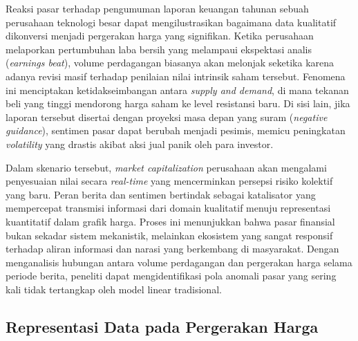 \begin{example}
    Reaksi pasar terhadap pengumuman laporan keuangan tahunan sebuah perusahaan teknologi besar dapat mengilustrasikan bagaimana data kualitatif dikonversi menjadi pergerakan harga yang signifikan. Ketika perusahaan melaporkan pertumbuhan laba bersih yang melampaui ekspektasi analis (\textit{earnings beat}), volume perdagangan biasanya akan melonjak seketika karena adanya revisi masif terhadap penilaian nilai intrinsik saham tersebut. Fenomena ini menciptakan ketidakseimbangan antara \textit{supply and demand}, di mana tekanan beli yang tinggi mendorong harga saham ke level resistansi baru. Di sisi lain, jika laporan tersebut disertai dengan proyeksi masa depan yang suram (\textit{negative guidance}), sentimen pasar dapat berubah menjadi pesimis, memicu peningkatan \textit{volatility} yang drastis akibat aksi jual panik oleh para investor.

    Dalam skenario tersebut, \textit{market capitalization} perusahaan akan mengalami penyesuaian nilai secara \textit{real-time} yang mencerminkan persepsi risiko kolektif yang baru. Peran berita dan sentimen bertindak sebagai katalisator yang mempercepat transmisi informasi dari domain kualitatif menuju representasi kuantitatif dalam grafik harga. Proses ini menunjukkan bahwa pasar finansial bukan sekadar sistem mekanistik, melainkan ekosistem yang sangat responsif terhadap aliran informasi dan narasi yang berkembang di masyarakat. Dengan menganalisis hubungan antara volume perdagangan dan pergerakan harga selama periode berita, peneliti dapat mengidentifikasi pola anomali pasar yang sering kali tidak tertangkap oleh model linear tradisional.
\end{example}

\subsection{Representasi Data pada Pergerakan Harga}

